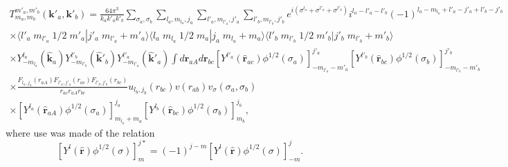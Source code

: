 \begin{multline}\label{eqC6AppG37}
T_{m_a,m_b}^{m'_a,m'_b}(\mathbf{k}'_a,\mathbf{k}'_b)=\frac{64\pi^3}{k_ak'_ak'_b}\sum_{\sigma_a,\sigma_b}\sum_{l_a,m_{l_a},j_a}\sum_{l'_a,m_{l'_a},j'_a}\sum_{l'_b,m_{l'_b},j'_b}
 e^{i(\sigma^{l_a}+\sigma^{l'_a}+\sigma^{l'_b})}i^{l_a-l'_a-l'_b}(-1)^{l_a-m_{l_a}+l'_a-j'_a+l'_b-j'_b}\\
\times \langle l'_a\;m_{l'_a}\;1/2\;m'_a|j'_a\;m_{l'_a}+m'_a\rangle \langle l_a\;m_{l_a}\;1/2\;m_a|j_a\;m_{l_a}+m_a\rangle\langle l'_b\;m_{l'_b}\;1/2\;m'_b|j'_b\;m_{l'_b}+m'_b\rangle\\
\times Y^{l_a}_{-m_{l_a}} (\hat {\mathbf{k}}_a)Y^{l'_b}_{-m_{l'_b}} (\hat {\mathbf{k}}'_b)Y^{l'_a}_{-m_{l'_a}} (\hat {\mathbf{k}}'_a)
\int d\mathbf{r}_{aA}d \mathbf{r}_{bc}\left[ Y^{l'_a} (\hat {\mathbf{r}}_{ac})\phi^{1/2}(\sigma_a)\right]^{j'_a}_{-m_{l'_a}-m'_a}\left[ Y^{l'_b} (\hat {\mathbf{r}}_{bc})\phi^{1/2}(\sigma_b)\right]^{j'_b}_{-m_{l'_b}-m'_b}\\
\times \frac{F_{l_a,j_a}(r_{aA})  F_{l'_a,j'_a}(r_{ac})F_{l'_b,j'_b}(r_{bc})}{r_{ac}r_{aA}r_{bc}}u_{l_b,j_b}(r_{bc})v(r_{ab})v_\sigma(\sigma_a,\sigma_b)\\
\times\left[ Y^{l_a} (\hat {\mathbf{r}}_{aA})\phi^{1/2}(\sigma_a)\right]^{j_a}_{m_{l_a}+m_a}\left[ Y^{l_b} (\hat {\mathbf{r}}_{bc})\phi^{1/2}(\sigma_b)\right]^{j_b}_{m_b},
\end{multline}
where  use was made of the relation
 \begin{equation}\label{eqC6AppG38}
\left[ Y^{l} (\hat {\mathbf{r}})\phi^{1/2}(\sigma)\right]^{j*}_{m}=(-1)^{j-m}\left[Y^{l} (\hat {\mathbf{r}})\phi^{1/2}(\sigma)\right]^{j}_{-m}.
\end{equation}
